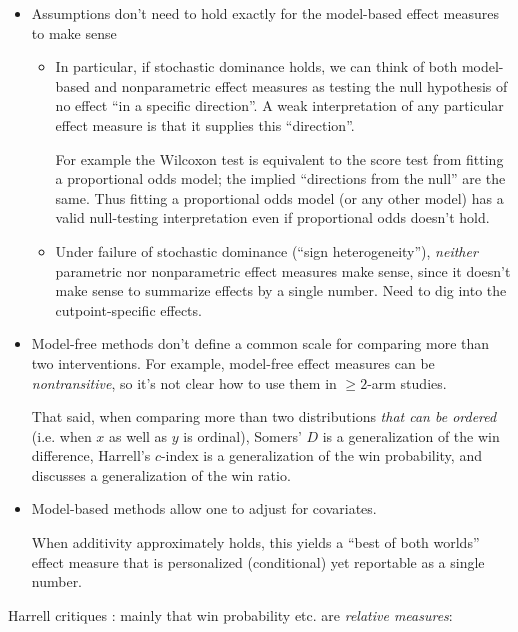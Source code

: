 \documentclass[
  11pt,
  fleqn
]{article}
\begin{document}
\begin{itemize}
  \item Assumptions don't need to hold exactly for the model-based
    effect measures to make sense
    \begin{itemize}
      \item In particular, if stochastic dominance holds, we can think of
        both model-based and nonparametric effect measures as
        testing the null hypothesis of no effect ``in a specific
        direction''. A weak interpretation of any particular
        effect measure
        is that it supplies this ``direction''.

        For example the Wilcoxon test is
        equivalent to the score test from fitting a proportional odds model;
        the implied ``directions from the null'' are the same.
        Thus fitting a proportional odds model (or any other model) has a
        valid null-testing
        interpretation even if proportional odds doesn't hold.
      \item Under failure of stochastic dominance (``sign
        heterogeneity''), \emph{neither} parametric nor nonparametric
        effect measures make sense, since it doesn't make sense to
        summarize effects by a single number. Need to dig into the
        cutpoint-specific effects.
    \end{itemize}
  \item Model-free methods don't define a common scale for comparing
    more than two interventions. For example, model-free effect
    measures can be \emph{nontransitive}, so it's not clear how to
    use them in $\geq 2$-arm studies.

    That said, when comparing more than two distributions \emph{that
    can be ordered} (i.e. when $x$ as well as $y$ is ordinal),
    Somers' $D$ is a generalization of the win difference, Harrell's
    $c$-index is a generalization of the win probability, and
    \citet{newsonParametersNonparametricStatistics2002} discusses a
    generalization of the win ratio.

  \item Model-based methods allow one to adjust for covariates.

    When additivity approximately holds, this yields a ``best of both
    worlds'' effect measure that is
    personalized (conditional) yet reportable as a single
    number.
\end{itemize}

Harrell critiques \citep{harrellOverviewCompositeOutcome2024,
harrellRareDegenerativeDiseases2024, harrellViewsCompositeOutcome}:
mainly that
win probability etc. are \emph{relative measures}:
\end{document}
